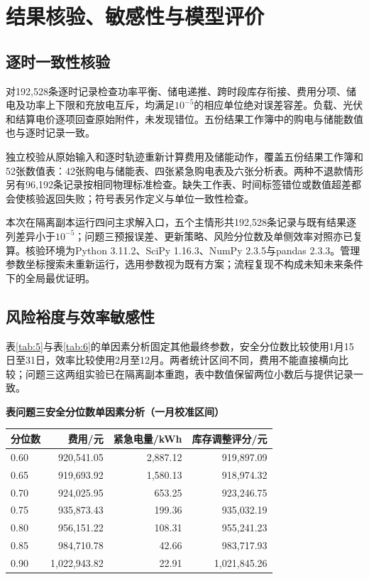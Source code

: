 \documentclass[12pt,a4paper,fontset=windows]{ctexart}
\newcommand{\papertable}[1]{\refstepcounter{table}\label{tab:\thetable}\textbf{表\thetable\quad #1}}
\begin{document}
\section{结果核验、敏感性与模型评价}
\subsection{逐时一致性核验}
对192,528条逐时记录检查功率平衡、储电递推、跨时段库存衔接、费用分项、储电及功率上下限和充放电互斥，均满足$10^{-5}$的相应单位绝对误差容差。负载、光伏和结算电价逐项回查原始附件，未发现错位。五份结果工作簿中的购电与储能数值也与逐时记录一致。

独立校验从原始输入和逐时轨迹重新计算费用及储能动作，覆盖五份结果工作簿和52张数值表：42张购电与储能表、四张紧急购电表及六张分析表。两种不退款情形另有96,192条记录按相同物理标准检查。缺失工作表、时间标签错位或数值超差都会使核验返回失败；符号表另作定义与单位一致性检查。

本次在隔离副本运行四问主求解入口，五个主情形共192,528条记录与既有结果逐列差异小于$10^{-5}$；问题三预报误差、更新策略、风险分位数及单侧效率对照亦已复算。核验环境为Python 3.11.2、SciPy 1.16.3、NumPy 2.3.5与pandas 2.3.3。管理参数坐标搜索未重新运行，选用参数视为既有方案；流程复现不构成未知未来条件下的全局最优证明。

\subsection{风险裕度与效率敏感性}
表\ref{tab:5}与表\ref{tab:6}的单因素分析固定其他最终参数，安全分位数比较使用1月15日至31日，效率比较使用2月至12月。两者统计区间不同，费用不能直接横向比较；问题三这两组实验已在隔离副本重跑，表中数值保留两位小数后与提供记录一致。


\par\addvspace{5pt}\noindent\begin{minipage}{\linewidth}\centering
\small
\papertable{问题三安全分位数单因素分析（一月校准区间）}\par\vspace{4pt}
\begin{tabular}{lrrr}
\toprule
分位数 & 费用/元 & 紧急电量/kWh & 库存调整评分/元 \\
\midrule
0.60 & 920,541.05 & 2,887.12 & 919,897.09 \\
0.65 & 919,693.92 & 1,580.13 & 918,974.32 \\
0.70 & 924,025.95 & 653.25 & 923,246.75 \\
0.75 & 935,873.43 & 199.36 & 935,032.19 \\
0.80 & 956,151.22 & 108.31 & 955,241.23 \\
0.85 & 984,710.78 & 42.66 & 983,717.93 \\
0.90 & 1,022,943.82 & 22.91 & 1,021,845.26 \\
\bottomrule
\end{tabular}
\end{minipage}\par\addvspace{5pt}
\end{document}
